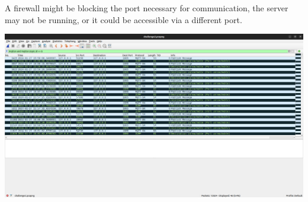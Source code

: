 \documentclass[11pt]{article}
\begin{document}
A firewall might be blocking the port necessary for communication, the
server may not be running, or it could be accessible via a different
port.

    \includegraphics{7b.png}


    
    
    
\end{document}
